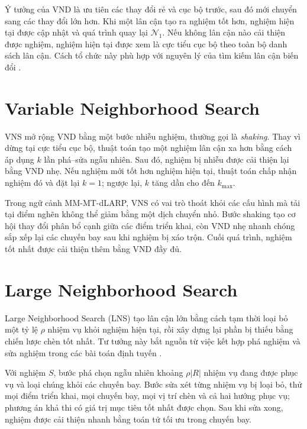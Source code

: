 Ý tưởng của VND là ưu tiên các thay đổi rẻ và cục bộ trước, sau đó mới chuyển sang các thay đổi lớn hơn. Khi một lân cận tạo ra nghiệm tốt hơn, nghiệm hiện tại được cập nhật và quá trình quay lại \(\mathcal{N}_1\). Nếu không lân cận nào cải thiện được nghiệm, nghiệm hiện tại được xem là cực tiểu cục bộ theo toàn bộ danh sách lân cận. Cách tổ chức này phù hợp với nguyên lý của tìm kiếm lân cận biến đổi \cite{mladenovic1997vns,hansen2001vns,hansen2010vns}.

\section{Variable Neighborhood Search}

VNS mở rộng VND bằng một bước nhiễu nghiệm, thường gọi là \textit{shaking}. Thay vì dừng tại cực tiểu cục bộ, thuật toán tạo một nghiệm lân cận xa hơn bằng cách áp dụng \(k\) lần phá--sửa ngẫu nhiên. Sau đó, nghiệm bị nhiễu được cải thiện lại bằng VND nhẹ. Nếu nghiệm mới tốt hơn nghiệm hiện tại, thuật toán chấp nhận nghiệm đó và đặt lại \(k=1\); ngược lại, \(k\) tăng dần cho đến \(k_{\max}\).

Trong ngữ cảnh MM-MT-dLARP, VNS có vai trò thoát khỏi các cấu hình mà tải tại điểm nghẽn không thể giảm bằng một dịch chuyển nhỏ. Bước shaking tạo cơ hội thay đổi phân bổ cạnh giữa các điểm triển khai, còn VND nhẹ nhanh chóng sắp xếp lại các chuyến bay sau khi nghiệm bị xáo trộn. Cuối quá trình, nghiệm tốt nhất được cải thiện thêm bằng VND đầy đủ.

\section{Large Neighborhood Search}

Large Neighborhood Search (LNS) tạo lân cận lớn bằng cách tạm thời loại bỏ một tỷ lệ \(\rho\) nhiệm vụ khỏi nghiệm hiện tại, rồi xây dựng lại phần bị thiếu bằng chiến lược chèn tốt nhất. Tư tưởng này bắt nguồn từ việc kết hợp phá nghiệm và sửa nghiệm trong các bài toán định tuyến \cite{shaw1998lns,ropke2006alns,pisinger2007vrp}.

Với nghiệm \(S\), bước phá chọn ngẫu nhiên khoảng \(\rho |R|\) nhiệm vụ đang được phục vụ và loại chúng khỏi các chuyến bay. Bước sửa xét từng nhiệm vụ bị loại bỏ, thử mọi điểm triển khai, mọi chuyến bay, mọi vị trí chèn và cả hai hướng phục vụ; phương án khả thi có giá trị mục tiêu tốt nhất được chọn. Sau khi sửa xong, nghiệm được cải thiện nhanh bằng toán tử tối ưu trong chuyến bay.


